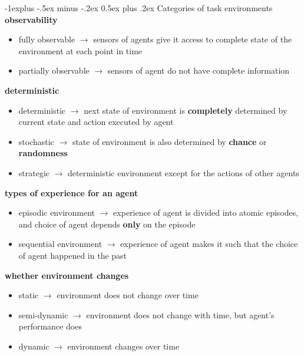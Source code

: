 \documentclass[a4paper,10pt,landscape]{article}
\makeatletter
\renewcommand{\subsection}{\@startsection{subsection}{2}{0mm}%
                                {-1explus -.5ex minus -.2ex}%
                                {0.5ex plus .2ex}%
                                {\normalfont\normalsize\bfseries}}
\makeatother
\begin{document}
\begin{multicols}{3}
\subsection{Categories of task environments}
\textbf{observability}
\begin{itemize} 
    \item fully observable $\rightarrow$ sensors of agents give it access to complete state of the environment at each point in time
    \item partially observable $\rightarrow$ sensors of agent do not have complete information
\end{itemize}

\textbf{deterministic}
\begin{itemize}
    \item deterministic $\rightarrow$ next state of environment is \textbf{completely} determined by current state and action executed by agent
    \item stochastic $\rightarrow$ state of environment is also determined by \textbf{chance} or \textbf{randomness}
    \item strategic $\rightarrow$ deterministic environment except for the actions of other agents
\end{itemize}

\textbf{types of experience for an agent}
\begin{itemize}
    \item episodic environment $\rightarrow$ experience of agent is divided into atomic episodes, and choice of agent depends \textbf{only} on the episode
    \item sequential environment $\rightarrow$ experience of agent makes it such that the choice of agent happened in the past
\end{itemize}

\textbf{whether environment changes}
\begin{itemize}
    \item static $\rightarrow$ environment does not change over time
    \item semi-dynamic $\rightarrow$ environment does not change with time, but agent's performance does
    \item dynamic $\rightarrow$ environment changes over time
\end{itemize}


\end{multicols}
\end{document}
